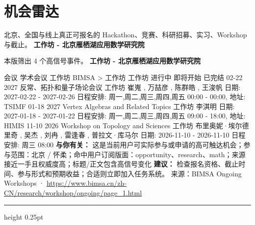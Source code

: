 \documentclass[10.5pt]{ctexart}
\begin{document}
\section*{机会雷达}
{\color{ormuted} 北京、全国与线上真正可报名的 Hackathon、竞赛、科研招募、实习、Workshop 与截止。}
\vspace{2mm}
{\LARGE\bfseries 工作坊 - 北京雁栖湖应用数学研究院}\par
\vspace{1mm}
{\color{ormuted} 本版筛出 4 个高信号事件。}
\vspace{3mm}
{\Large\bfseries 工作坊 - 北京雁栖湖应用数学研究院}\par
会议 学术会议 工作坊 BIMSA > 工作坊 工作坊 进行中 即将开始 已完结 02-22 2027 反常、拓扑和量子场论会议 工作坊 崔嵬 , 万喆彦 , 陈群皓 , 王浚帆 日期: 2027-02-22 - 2027-02-26 日程安排: 周一,周二,周三,周四,周五 00:00 - 00:00, 地址: TSIMF 01-18 2027 Vertex Algebras and Related Topics 工作坊 李淇明 日期: 2027-01-18 - 2027-01-22 日程安排: 周一,周二,周三,周四,周五 09:00 - 18:00, 地址: HIMIS 11-10 2026 Workshop on Topology and Sciences 工作坊 布里奥妮·埃尔德里奇 , 吴杰 , 刘冉 , 雷逢春 , 普拉文·库马尔 日期: 2026-11-10 - 2026-11-10 日程安排: 周三 08:00
\textbf{与你有关：} 这是当前用户可实际参与或申请的高可触达机会；参与范围：北京 / 怀柔；命中用户订阅版面：opportunity、research、math；来源接近一手且权威度高；标题/正文包含高信号变化
\textbf{建议：} 检查报名资格、截止时间、参与形式和预期收益；合适则立即加入任务系统。
{\footnotesize\color{ormuted} 来源：BIMSA Ongoing Workshops · \url{https://www.bimsa.cn/zh-CN/research/workshop/ongoing/page_1.html}}
\vspace{4mm}
\hrule height 0.25pt
\vspace{3mm}
\end{document}
